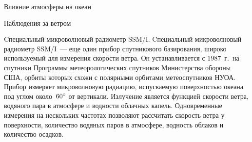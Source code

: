 \begin{chapter}{Влияние атмосферы на океан}
\begin{section}{Наблюдения за ветром}
\begin{paragraph}{Cпециальный микроволновый радиометр SSM/I.}
Cпециальный микроволновый радиометр SSM/I~--- еще один прибор
спутникового базирования, широко используемый для измерения скорости
ветра. Он устанавливается с 1987~г.\ на спутники Программы метеорологических 
спутников Министерства обороны США, орбиты которых схожи с полярными
орбитами метеоспутников НУОА. Прибор измеряет микроволновую радиацию,
испускаемую поверхностью океана под углом около~${60}^\circ$ от
вертикали. Излучение является функцией скорости ветра, водяного пара в
атмосфере и водности облачных капель. Одновременные измерения на
нескольких частотах позволяют рассчитать скорость ветра у поверхности,
количество водяных паров в атмосфере, водность облаков и количество осадков.
%


\end{paragraph}
\end{section}
\end{chapter}
